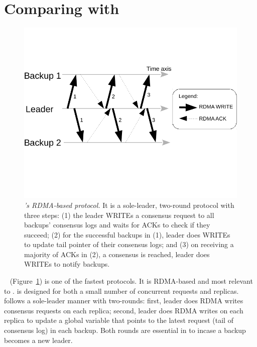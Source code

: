 % 

\section{Comparing \xxx with \dare}\label{sec:compare}

\begin{figure}[t]
\centering
\vspace{-.4in}
\includegraphics[width=.35\textwidth]{figures/dare_algo}
\vspace{-.53in}
\caption{{\em \dare's RDMA-based protocol.} It is a sole-leader, 
two-round protocol with three steps: (1) the leader WRITEs a consensus request 
to all backups' consensus logs and waits for ACKs to check if they succeed; 
(2) for the successful backups in (1), leader does WRITEs to update tail 
pointer of their consensus logs; and (3) on receiving a majority of ACKs in 
(2), a consensus is reached, leader does WRITEs to notify backups.}
\label{fig:dare}
\vspace{-.20in}
\end{figure}

\dare~\cite{dare:hpdc15} (Figure~\ref{fig:dare}) is one of 
the fastest \paxos protocols. It is RDMA-based and most relevant to \xxx. \dare 
is designed for both a small number of concurrent requests and 
replicas. \dare follows a sole-leader manner with two-rounds: 
first, leader does RDMA writes consensus requests on each replica; second, 
leader does RDMA writes on each replica to update a global variable that points 
to the latest request (tail of consensus log) in each backup. Both rounds are 
essential in \dare to incase a backup becomes a new leader.

% 

